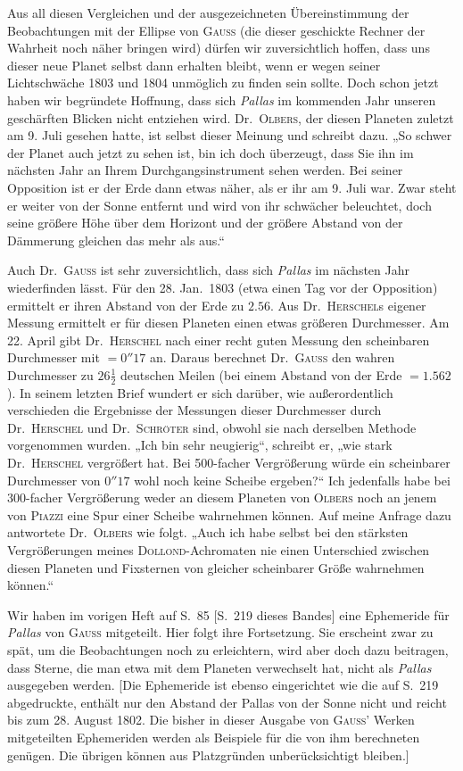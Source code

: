Aus all diesen Vergleichen und der ausgezeichneten Übereinstimmung der Beobachtungen mit der Ellipse von \textsc{Gauß} (die dieser geschickte Rechner der Wahrheit noch näher bringen wird) dürfen wir zuversichtlich hoffen, dass uns dieser neue Planet selbst dann erhalten bleibt, wenn er wegen seiner Lichtschwäche 1803 und 1804 unmöglich zu finden sein sollte. Doch schon jetzt haben wir begründete Hoffnung, dass sich \textit{Pallas} im kommenden Jahr unseren geschärften Blicken nicht entziehen wird. Dr.\ \textsc{Olbers}, der diesen Planeten zuletzt am 9. Juli gesehen hatte, ist selbst dieser Meinung und schreibt dazu. „So schwer der Planet auch jetzt zu sehen ist, bin ich doch überzeugt, dass Sie ihn im nächsten Jahr an Ihrem Durchgangsinstrument sehen werden. Bei seiner Opposition ist er der Erde dann etwas näher, als er ihr am 9. Juli war. Zwar steht er weiter von der Sonne entfernt und wird von ihr schwächer beleuchtet, doch seine größere Höhe über dem Horizont und der größere Abstand von der Dämmerung gleichen das mehr als aus.“

Auch Dr.\ \textsc{Gauß} ist sehr zuversichtlich, dass sich \textit{Pallas} im nächsten Jahr wiederfinden lässt. Für den 28. Jan.\ 1803 (etwa einen Tag vor der Opposition) ermittelt er ihren Abstand von der Erde zu $2.56$. Aus Dr.\ \textsc{Herschel}s eigener Messung ermittelt er für diesen Planeten einen etwas größeren Durchmesser. Am 22. April gibt Dr.\ \textsc{Herschel} nach einer recht guten Messung den scheinbaren Durchmesser mit $=0''17$ an. Daraus berechnet Dr.\ \textsc{Gauß} den wahren Durchmesser zu $26\frac{1}{2}$ deutschen Meilen (bei einem Abstand von der Erde $=1.562$). In seinem letzten Brief wundert er sich darüber, wie außerordentlich verschieden die Ergebnisse der Messungen dieser Durchmesser durch Dr.\ \textsc{Herschel} und Dr.\ \textsc{Schröter} sind, obwohl sie nach derselben Methode vorgenommen wurden. „Ich bin sehr neugierig“, schreibt er, „wie stark Dr.\ \textsc{Herschel} vergrößert hat. Bei 500-facher Vergrößerung würde ein scheinbarer Durchmesser von $0''17$ wohl noch keine Scheibe ergeben?“ Ich jedenfalls habe bei 300-facher Vergrößerung weder an diesem Planeten von \textsc{Olbers} noch an jenem von \textsc{Piazzi} eine Spur einer Scheibe wahrnehmen können. Auf meine Anfrage dazu antwortete Dr.\ \textsc{Olbers} wie folgt. „Auch ich habe selbst bei den stärksten Vergrößerungen meines \textsc{Dollond}-Achromaten nie einen Unterschied zwischen diesen Planeten und Fixsternen von gleicher scheinbarer Größe wahrnehmen können.“

Wir haben im vorigen Heft auf S.\ 85 [S.\ 219 dieses Bandes] eine Ephemeride für \textit{Pallas} von \textsc{Gauß} mitgeteilt. Hier folgt ihre Fortsetzung. Sie erscheint zwar zu spät, um die Beobachtungen noch zu erleichtern, wird aber doch dazu beitragen, dass Sterne, die man etwa mit dem Planeten verwechselt hat, nicht als \textit{Pallas} ausgegeben werden. [Die Ephemeride ist ebenso eingerichtet wie die auf S.\ 219 abgedruckte, enthält nur den Abstand der Pallas von der Sonne nicht und reicht bis zum 28. August 1802. Die bisher in dieser Ausgabe von \textsc{Gauß}’ Werken mitgeteilten Ephemeriden werden als Beispiele für die von ihm berechneten genügen. Die übrigen können aus Platzgründen unberücksichtigt bleiben.]
